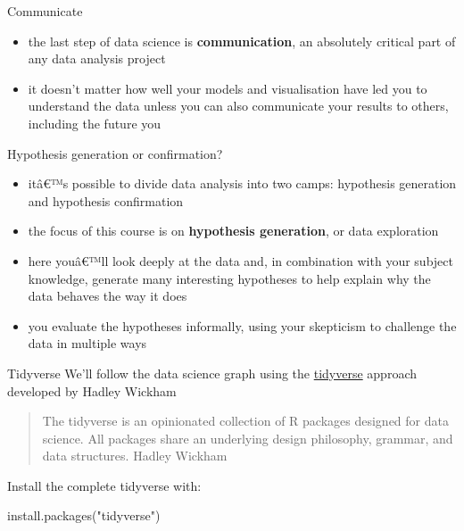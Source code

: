 \documentclass[
  ignorenonframetext,
]{beamer}
\newenvironment{Shaded}{\begin{snugshade}}{\end{snugshade}}
\newcommand{\FunctionTok}[1]{\textcolor[rgb]{0.00,0.00,0.00}{#1}}
\newcommand{\NormalTok}[1]{#1}
\newcommand{\StringTok}[1]{\textcolor[rgb]{0.31,0.60,0.02}{#1}}
\providecommand{\tightlist}{%
  \setlength{\itemsep}{0pt}\setlength{\parskip}{0pt}}
\begin{document}
\begin{frame}{Communicate}
\protect\hypertarget{communicate}{}
\begin{itemize}[<+->]
\tightlist
\item
  the last step of data science is \textbf{communication}, an absolutely
  critical part of any data analysis project
\item
  it doesn't matter how well your models and visualisation have led you
  to understand the data unless you can also communicate your results to
  others, including the future you
\end{itemize}
\end{frame}

\begin{frame}{Hypothesis generation or confirmation?}
\protect\hypertarget{hypothesis-generation-or-confirmation}{}
\begin{itemize}[<+->]
\tightlist
\item
  itâ€™s possible to divide data analysis into two camps: hypothesis
  generation and hypothesis confirmation
\item
  the focus of this course is on \textbf{hypothesis generation}, or data
  exploration
\item
  here youâ€™ll look deeply at the data and, in combination with your
  subject knowledge, generate many interesting hypotheses to help
  explain why the data behaves the way it does
\item
  you evaluate the hypotheses informally, using your skepticism to
  challenge the data in multiple ways
\end{itemize}
\end{frame}

\begin{frame}[fragile]{Tidyverse}
\protect\hypertarget{tidyverse}{}
We'll follow the data science graph using the
\href{https://www.tidyverse.org}{tidyverse} approach developed by Hadley
Wickham

\begin{quote}
The tidyverse is an opinionated collection of R packages designed for
data science. All packages share an underlying design philosophy,
grammar, and data structures. Hadley Wickham
\end{quote}

Install the complete tidyverse with:

\begin{Shaded}
\begin{Highlighting}[]
\FunctionTok{install.packages}\NormalTok{(}\StringTok{"tidyverse"}\NormalTok{)}
\end{Highlighting}
\end{Shaded}
\end{frame}
\end{document}
